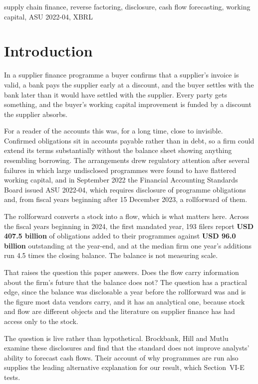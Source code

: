 \documentclass[conference,a4paper]{IEEEtran}
\begin{document}
\begin{IEEEkeywords}
supply chain finance, reverse factoring, disclosure, cash flow forecasting,
working capital, ASU 2022-04, XBRL
\end{IEEEkeywords}

\section{Introduction}

In a supplier finance programme a buyer confirms that a supplier's invoice is
valid, a bank pays the supplier early at a discount, and the buyer settles with
the bank later than it would have settled with the supplier. Every party gets
something, and the buyer's working capital improvement is funded by a discount
the supplier absorbs.

For a reader of the accounts this was, for a long time, close to invisible.
Confirmed obligations sit in accounts payable rather than in debt, so a firm
could extend its terms substantially without the balance sheet showing anything
resembling borrowing. The arrangements drew regulatory attention after several
failures in which large undisclosed programmes were found to have flattered
working capital, and in September 2022 the Financial Accounting Standards Board
issued ASU 2022-04, which requires disclosure of programme obligations and,
from fiscal years beginning after 15 December 2023, a rollforward of them.

The rollforward converts a stock into a flow, which is what matters here. Across
the fiscal years beginning in 2024, the first mandated year, 193 filers report
\textbf{USD 407.5 billion} of obligations added to their programmes against
\textbf{USD 96.0 billion} outstanding at the year-end, and at the median firm one
year's additions run 4.5 times the closing balance. The balance is not measuring
scale.

That raises the question this paper answers. Does the flow carry information
about the firm's future that the balance does not? The question has a practical
edge, since the balance was disclosable a year before the rollforward was and is
the figure most data vendors carry, and it has an analytical one, because stock
and flow are different objects and the literature on supplier finance has had
access only to the stock.

The question is live rather than hypothetical. Brockbank, Hill and Mutlu
\cite{brockbank2025} examine these disclosures and find that the standard does
not improve analysts' ability to forecast cash flows. Their account of why
programmes are run also supplies the leading alternative explanation for our
result, which Section~VI-E tests.
\end{document}
